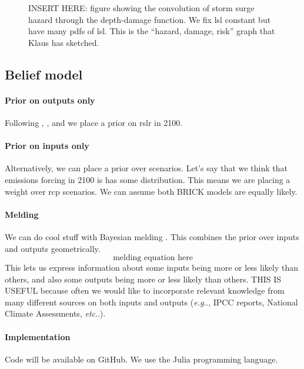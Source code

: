 \documentclass[12pt]{article}
\makeatletter
\DeclareRobustCommand\onedot{\futurelet\@let@token\@onedot}
\def\@onedot{\ifx\@let@token.\else.\null\fi\xspace}
\def\eg{\emph{e.g}\onedot} \def\Eg{\emph{E.g}\onedot}
\def\etc{\emph{etc}\onedot} \def\vs{\emph{vs}\onedot}
\makeatother
\begin{document}
\begin{figure}
    \caption{
        INSERT HERE: figure showing the convolution of storm surge hazard through the depth-damage function.
        We fix \gls{lsl} constant but have many \glspl{pdf} of \gls{lsl}.
        This is the ``hazard, damage, risk'' graph that Klaus has sketched.
    }
\end{figure}

\subsection{Belief model}

\paragraph{Prior on outputs only}
Following \citet{garner_slrise:2018}, \citet{oddo_coastal:2017}, and \citet{lempert_slr:2012} we place a prior on \gls{rslr} in 2100.

\paragraph{Prior on inputs only}
Alternatively, we can place a prior over scenarios.
Let's say that we think that emissions forcing in 2100 is has some distribution.
This means we are placing a weight over \gls{rcp} scenarios.
We can assume both BRICK models are equally likely.

\paragraph{Melding}
We can do cool stuff with Bayesian melding \citep{poole_melding:2000,sevcikova_melding:2007}.
This combines the prior over inputs and outputs geometrically.
\begin{equation}\label{eq:melding}
    \text{melding equation here}
\end{equation}
This lets us express information about some inputs being more or less likely than others, and also some outputs being more or less likely than others.
THIS IS USEFUL because often we would like to incorporate relevant knowledge from many different sources on both inputs and outputs (\eg, IPCC reports, National Climate Assessments, \etc).

\paragraph{Implementation}
Code will be available on GitHub.
We use the Julia programming language.
\end{document}
